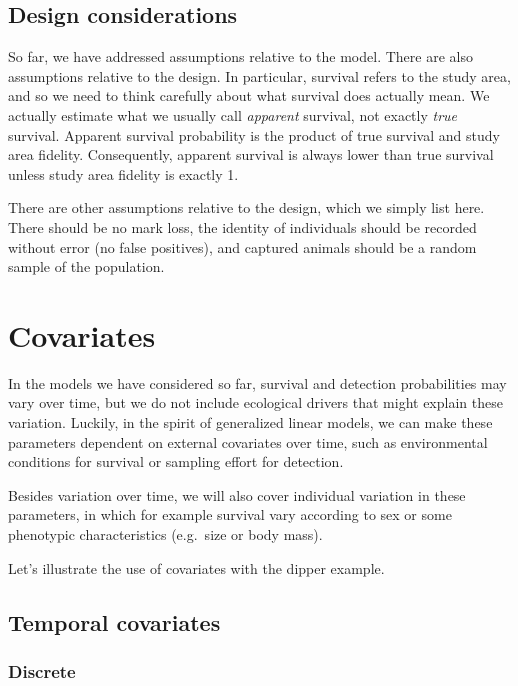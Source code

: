 \documentclass[
  12pt,
]{krantz}
\begin{document}
\subsection{Design considerations}\label{design-considerations}

So far, we have addressed assumptions relative to the model. There are also assumptions relative to the design. In particular, survival refers to the study area, and so we need to think carefully about what survival does actually mean. We actually estimate what we usually call \emph{apparent} survival, not exactly \emph{true} survival. Apparent survival probability is the product of true survival and study area fidelity. Consequently, apparent survival is always lower than true survival unless study area fidelity is exactly 1.

There are other assumptions relative to the design, which we simply list here. There should be no mark loss, the identity of individuals should be recorded without error (no false positives), and captured animals should be a random sample of the population.

\section{Covariates}\label{covariates}

In the models we have considered so far, survival and detection probabilities may vary over time, but we do not include ecological drivers that might explain these variation. Luckily, in the spirit of generalized linear models, we can make these parameters dependent on external covariates over time, such as environmental conditions for survival or sampling effort for detection.

Besides variation over time, we will also cover individual variation in these parameters, in which for example survival vary according to sex or some phenotypic characteristics (e.g.~size or body mass).

Let's illustrate the use of covariates with the dipper example.

\subsection{Temporal covariates}\label{temporal-covariates}

\subsubsection{Discrete}\label{discrete}
\end{document}
